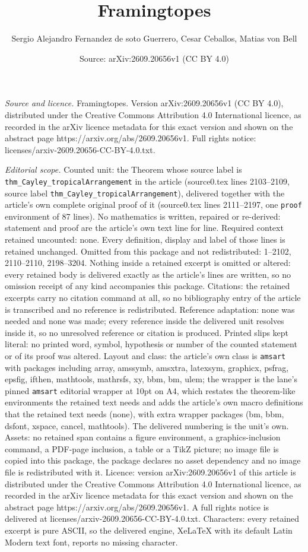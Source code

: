 \documentclass[10pt,a4paper]{amsart}
\title[Framingtopes]{Framingtopes}
\author{Sergio Alejandro Fernandez de soto Guerrero, Cesar Ceballos, Matias von Bell}
\date{Source: arXiv:2609.20656v1 (CC BY 4.0)}
\begin{document}
\maketitle

\noindent\emph{Source and licence.} Framingtopes. Version arXiv:2609.20656v1 (CC BY 4.0), distributed under the Creative Commons Attribution 4.0 International licence, as recorded in the arXiv licence metadata for this exact version and shown on the abstract page https://arxiv.org/abs/2609.20656v1. Full rights notice: licenses/arxiv-2609.20656-CC-BY-4.0.txt.\par\smallskip

\noindent\textit{Editorial scope.} Counted unit: the Theorem whose source label is \texttt{thm\_Cayley\_tropicalArrangement} in the article (source0.tex lines 2103--2109, source label \texttt{thm\_Cayley\_tropicalArrangement}), delivered together with the article's own complete original proof of it (source0.tex lines 2111--2197, one \texttt{proof} environment of 87 lines). No mathematics is written, repaired or re-derived: statement and proof are the article's own text line for line. Required context retained uncounted: none. Every definition, display and label of those lines is retained unchanged. Omitted from this package and not redistributed: 1--2102, 2110--2110, 2198--3204. Nothing inside a retained excerpt is omitted or altered: every retained body is delivered exactly as the article's lines are written, so no omission receipt of any kind accompanies this package. Citations: the retained excerpts carry no citation command at all, so no bibliography entry of the article is transcribed and no reference is redistributed. Reference adaptation: none was needed and none was made; every reference inside the delivered unit resolves inside it, so no unresolved reference or citation is produced. Printed slips kept literal: no printed word, symbol, hypothesis or number of the counted statement or of its proof was altered. Layout and class: the article's own class is \texttt{amsart} with packages including array, amssymb, amsxtra, latexsym, graphicx, psfrag, epsfig, ifthen, mathtools, mathrsfs, xy, bbm, bm, ulem; the wrapper is the lane's pinned \texttt{amsart} editorial wrapper at 10pt on A4, which restates the theorem-like environments the retained text needs and adds the article's own macro definitions that the retained text needs (none), with extra wrapper packages (bm, bbm, dsfont, xspace, cancel, mathtools). The delivered numbering is the unit's own. Assets: no retained span contains a figure environment, a graphics-inclusion command, a PDF-page inclusion, a table or a TikZ picture; no image file is copied into this package, the package declares no asset dependency and no image file is redistributed with it. Licence: version arXiv:2609.20656v1 of this article is distributed under the Creative Commons Attribution 4.0 International licence, as recorded in the arXiv licence metadata for this exact version and shown on the abstract page https://arxiv.org/abs/2609.20656v1. A full rights notice is delivered at licenses/arxiv-2609.20656-CC-BY-4.0.txt. Characters: every retained excerpt is pure ASCII, so the delivered engine, XeLaTeX with its default Latin Modern text font, reports no missing character.
\end{document}

